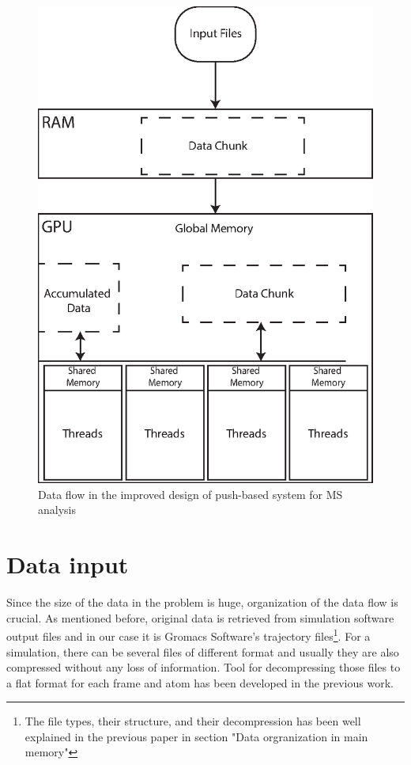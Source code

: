 \documentclass[11pt,a4paper]{report}
\begin{document}
\begin{figure}
 \centerline{ \includegraphics[width=0.65\columnwidth]{images/memory-organization.eps} }
 \caption{Data flow in the improved design of push-based system for MS analysis}
 \label{fg:data-flow}
\end{figure}

\section{Data input}
Since the size of the data in the problem is huge, organization of the data flow is crucial. As mentioned before, original data is retrieved from simulation software output files and in our case it is Gromacs Software's trajectory files\footnote{The file types, their structure, and their decompression has been well explained in the previous paper in section "Data orgranization in main memory"}. For a simulation, there can be several files of different format and usually they are also compressed without any loss of information. Tool for decompressing those files to a flat format for each frame and atom has been developed in the previous work\cite{mainPaper}. 
\end{document}
